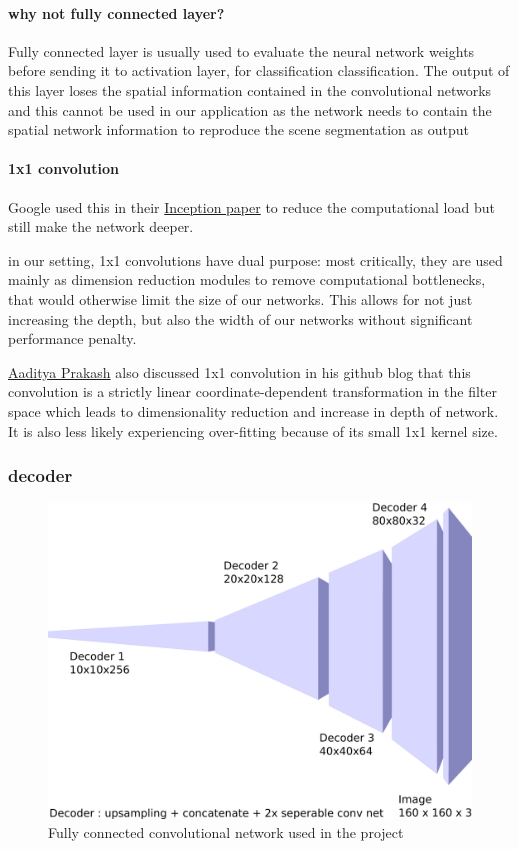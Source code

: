 \documentclass[paper=a4, fontsize=11pt]{scrartcl} %
\numberwithin{equation}{section} %
\numberwithin{figure}{section} %
\numberwithin{table}{section} %
\begin{document}
\paragraph{why not fully connected layer?} Fully connected layer is usually used to evaluate the neural network weights before sending it to activation layer, for classification classification. The output of this layer loses the spatial information contained in the convolutional networks and this cannot be used in our application as the network needs to contain the spatial network information to reproduce the scene segmentation as output

\paragraph{1x1 convolution} Google used this in their \href{https://arxiv.org/abs/1409.4842}{Inception paper} to reduce the computational load but still make the network deeper.

\begin{displayquote}
	in our setting, 1x1 convolutions have dual purpose: most critically, they are used mainly as dimension reduction modules to remove computational bottlenecks, that would otherwise limit the size of our networks. This allows for not just increasing the depth, but also the width of our networks without significant performance penalty.
\end{displayquote}

\href{https://iamaaditya.github.io/2016/03/one-by-one-convolution/}{Aaditya Prakash} also discussed 1x1 convolution in his github blog that this convolution is a strictly linear coordinate-dependent transformation in the filter space which leads to dimensionality reduction and increase in depth of network. It is also less likely experiencing over-fitting because of its small 1x1 kernel size. 

\subsubsection{decoder}
\begin{figure}[htp]
	\centering
	\includegraphics[scale=0.2]{./imgs/decoder.png}
	\caption{Fully connected convolutional network used in the project}
	\label{fig:decoder}
\end{figure}
\end{document}
